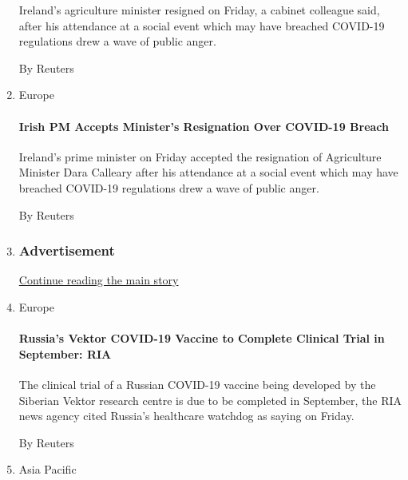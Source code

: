 \begin{enumerate}
  Ireland's agriculture minister resigned on Friday, a cabinet colleague
  said, after his attendance at a social event which may have breached
  COVID-19 regulations drew a wave of public anger.

  By Reuters
\item
  Europe

  \href{/reuters/2020/08/21/world/europe/21reuters-health-coronavirus-ireland.html?searchResultPosition=4}{}

  \hypertarget{irish-pm-accepts-ministers-resignation-over-covid-19-breach}{%
  \paragraph{Irish PM Accepts Minister's Resignation Over COVID-19
  Breach}\label{irish-pm-accepts-ministers-resignation-over-covid-19-breach}}

  Ireland's prime minister on Friday accepted the resignation of
  Agriculture Minister Dara Calleary after his attendance at a social
  event which may have breached COVID-19 regulations drew a wave of
  public anger.

  By Reuters
\item
  \hypertarget{advertisement}{%
  \subsubsection{Advertisement}\label{advertisement}}

  \protect\hyperlink{after-mid206}{Continue reading the main story}
\item
  Europe

  \href{/reuters/2020/08/21/world/europe/21reuters-health-coronavirus-russia-vaccine.html?searchResultPosition=5}{}

  \hypertarget{russias-vektor-covid-19-vaccine-to-complete-clinical-trial-in-september-ria}{%
  \paragraph{Russia's Vektor COVID-19 Vaccine to Complete Clinical Trial
  in September:
  RIA}\label{russias-vektor-covid-19-vaccine-to-complete-clinical-trial-in-september-ria}}

  The clinical trial of a Russian COVID-19 vaccine being developed by
  the Siberian Vektor research centre is due to be completed in
  September, the RIA news agency cited Russia's healthcare watchdog as
  saying on Friday.

  By Reuters
\item
  Asia Pacific


\end{enumerate}
